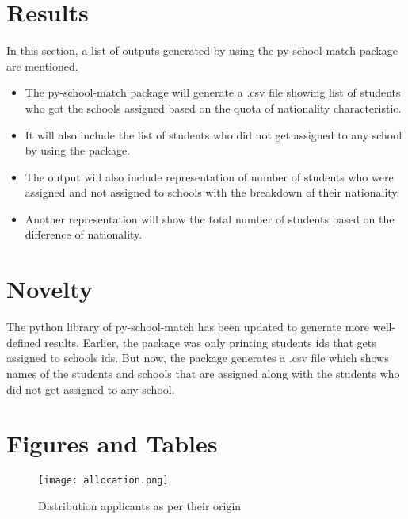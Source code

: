 \documentclass[twocolumn]{bmcart}
\begin{document}
		
		\section*{Results}
		\vspace{\baselineskip}
		In this section, a list of outputs generated by using the py-school-match package are mentioned.\vspace{\baselineskip}
		
		\begin{itemize}
			\vspace{-0.4cm}\item The py-school-match package will generate a .csv file showing list of students who got the schools assigned based on the quota of nationality characteristic. \vspace{\baselineskip}
			\vspace{-0.4cm}\item It will also include the list of students who did not get assigned to any school by using the package. \vspace{\baselineskip}
			\vspace{-0.4cm}\item The output will also include representation of number of students who were assigned and not assigned to schools with the breakdown of their nationality. \vspace{\baselineskip}
			\vspace{-0.4cm}\item Another representation will show the total number of students based on the difference of nationality. \vspace{\baselineskip}
		\end{itemize}
		
		\section*{Novelty}
		
		The python library of py-school-match has been updated to generate more well-defined results. Earlier, the package was only printing students ids that gets assigned to schools ids. But now, the package generates a .csv file which shows names of the students and schools that are assigned along with the students who did not get assigned to any school.
		
		\section*{Figures and Tables}
		\begin{figure}[h!]
			\centering
                        \texttt{[image: allocation.png]}
			\caption{Distribution applicants as per their origin}
			\label{fig:Distribution}
		\end{figure}
		
\end{document}
